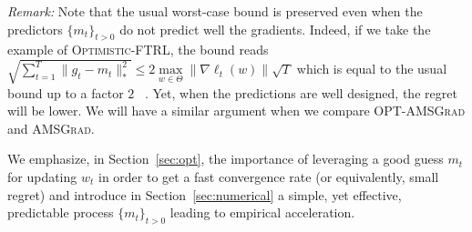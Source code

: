 \documentclass[11pt]{article}
\theoremstyle{k}
\begin{document}
\textit{Remark:} Note that the usual worst-case bound is preserved even when the predictors $\{m_{t}\}_{t>0}$ do not predict well the gradients. Indeed, if we take the example of \textsc{Optimistic-FTRL}, the bound reads $\sqrt{\sum_{t=1}^T \| g_t - m_t \|_*^2 } \leq 2 \max \limits_{w \in \Theta} \| \nabla \ell_t(w) \| \sqrt{T}$ which is equal to the usual bound up to a factor $2$~\citep{rakhlin2013online} . 
Yet, when the predictions are well designed, the regret will be lower. We will have a similar argument when we compare \textsc{OPT-AMSGrad} and \textsc{AMSGrad}.

We emphasize, in Section~\ref{sec:opt}, the importance of leveraging a good guess $m_t$ for updating $w_t$ in order to get a fast convergence rate (or equivalently, small regret) and introduce in Section~\ref{sec:numerical} a simple, yet effective, predictable process $\{m_{t}\}_{t>0}$ leading to empirical acceleration.
\end{document}
